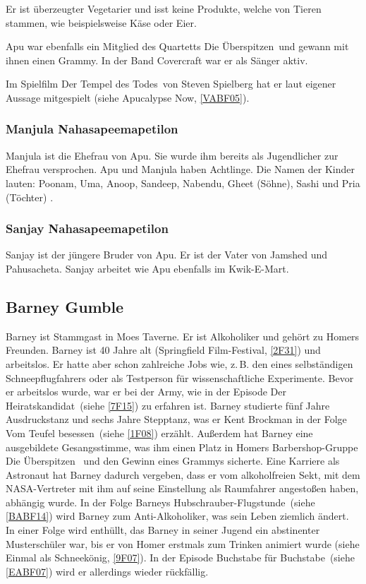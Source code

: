 Er ist überzeugter Vegetarier und isst keine Produkte, welche von Tieren stammen, wie beispielsweise Käse oder Eier.

Apu war ebenfalls ein Mitglied des Quartetts \glqq Die Überspitzen\grqq\ und gewann mit ihnen einen Grammy. In der Band Covercraft war er als Sänger aktiv.

Im Spielfilm \glqq Der Tempel des Todes\grqq\ von Steven Spielberg hat er laut eigener Aussage mitgespielt (siehe \glqq Apucalypse Now\grqq , \ref{VABF05}).


\subsubsection{Manjula Nahasapeemapetilon}
Manjula ist die Ehefrau von Apu. Sie wurde ihm bereits als Jugendlicher zur Ehefrau versprochen. Apu und Manjula haben Achtlinge. Die Namen der Kinder lauten:
Poonam, Uma, Anoop, Sandeep, Nabendu, Gheet (Söhne), Sashi und Pria (Töchter) \cite{SpringfieldAt}.

\subsubsection{Sanjay Nahasapeemapetilon}\label{NahasapeemapetilonSanjay}
Sanjay ist der jüngere Bruder von Apu. Er ist der Vater von Jamshed und Pahusacheta. Sanjay arbeitet wie Apu ebenfalls im Kwik-E-Mart.


\subsection{Barney Gumble}
Barney ist Stammgast in Moes Taverne. Er ist Alkoholiker und gehört zu Homers Freunden. Barney ist 40 Jahre alt (\glqq Springfield Film-Festival\grqq , \ref{2F31}) und arbeitslos. Er hatte aber schon zahlreiche Jobs wie, z.\,B. den eines selbständigen Schneepflugfahrers oder als Testperson für wissenschaftliche Experimente. Bevor er arbeitslos wurde, war er bei der Army, wie in der Episode \glqq Der Heiratskandidat\grqq\ (siehe \ref{7F15}) zu erfahren ist. Barney studierte fünf Jahre Ausdruckstanz und sechs Jahre Stepptanz, was er Kent Brockman in der Folge \glqq Vom Teufel besessen\grqq\ (siehe \ref{1F08}) erzählt. Außerdem hat Barney eine ausgebildete Gesangsstimme, was ihm einen Platz in Homers Barbershop-Gruppe \glqq Die Überspitzen\grqq\  und den Gewinn eines Grammys sicherte. Eine Karriere als Astronaut hat Barney dadurch vergeben, dass er vom alkoholfreien Sekt, mit dem NASA-Vertreter mit ihm auf seine Einstellung als Raumfahrer angestoßen haben, abhängig wurde. In der Folge \glqq Barneys Hubschrauber-Flugstunde\grqq\ (siehe \ref{BABF14}) wird Barney zum Anti-Alkoholiker, was sein Leben ziemlich ändert. In einer Folge wird enthüllt, das Barney in seiner Jugend ein abstinenter Musterschüler war, bis er von Homer erstmals zum Trinken animiert wurde (siehe \glqq Einmal als Schneekönig\grqq , \ref{9F07}). In der Episode \glqq Buchstabe für Buchstabe\grqq\ (siehe \ref{EABF07}) wird er allerdings wieder rückfällig.


